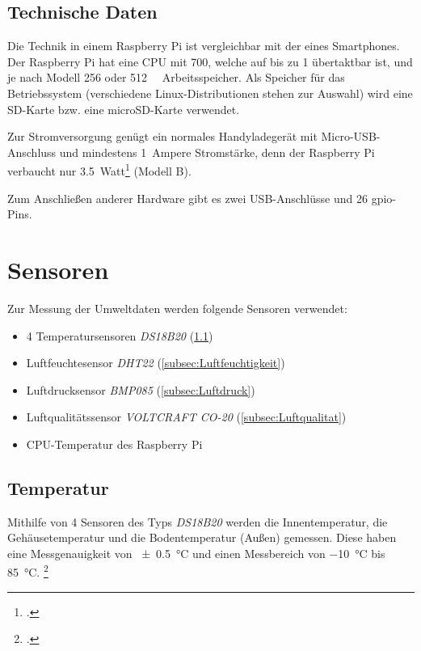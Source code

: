 \subsection{Technische Daten}
\label{subsec:Technische Daten}
Die Technik in einem Raspberry Pi ist vergleichbar mit der eines Smartphones. Der Raspberry Pi hat eine \gls{CPU} mit \SI{700}{}, welche auf bis zu \SI{1}{} übertaktbar ist, und je nach Modell \SI{256}{} oder \SI{512}{\mega\byte} Arbeitsspeicher. Als Speicher für das Betriebssystem (verschiedene Linux-Distributionen stehen zur Auswahl) wird eine SD-Karte bzw. eine microSD-Karte verwendet.

Zur Stromversorgung genügt ein normales Handyladegerät mit Micro-USB-Anschluss und mindestens \SI{1}{\gls{Ampere}} Stromstärke, denn der Raspberry Pi verbaucht nur \SI{3.5}{Watt}\footcite{strom} (Modell B).

Zum Anschließen anderer Hardware gibt es zwei USB-Anschlüsse und 26 \gls{gpio}-Pins.

\section{Sensoren}
\label{sec:Sensoren}

Zur Messung der Umweltdaten werden folgende Sensoren verwendet:
\begin{itemize}
\item 4 Temperatursensoren \emph{DS18B20} (\ref{subsec:Temperatur})
\item Luftfeuchtesensor \emph{DHT22} (\ref{subsec:Luftfeuchtigkeit})
\item Luftdrucksensor \emph{BMP085} (\ref{subsec:Luftdruck})
\item Luftqualitätssensor \emph{VOLTCRAFT CO-20} (\ref{subsec:Luftqualitat})
\item\gls{CPU}-Temperatur des Raspberry Pi
\end{itemize}
\subsection{Temperatur}
\label{subsec:Temperatur}

Mithilfe von 4 Sensoren des Typs \emph{DS18B20} werden die Innentemperatur, die Gehäusetemperatur und die Bodentemperatur (Außen) gemessen. Diese haben eine Messgenauigkeit von \SI{\pm 0.5}{\degreeCelsius}  und einen Messbereich von \SI{-10}{\degreeCelsius}  bis \SI{+85}{\degreeCelsius}. \footcite[20]{temp}

